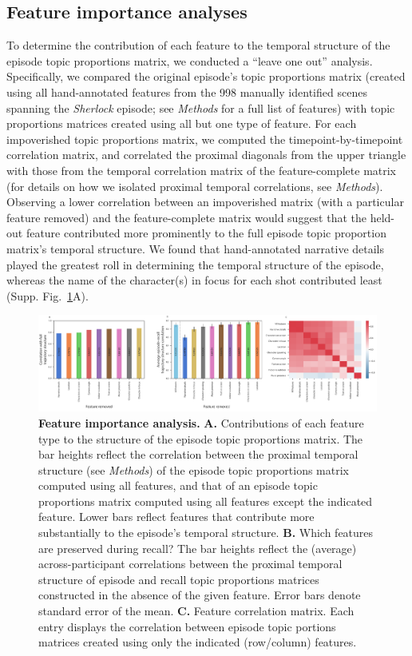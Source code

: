\documentclass{article}
\begin{document}
\subsection*{Feature importance analyses}
To determine the contribution of each feature to the temporal structure of the episode topic proportions matrix, we conducted a ``leave one out'' analysis.  Specifically, we compared the original episode's topic proportions matrix (created using all hand-annotated features from the 998 manually identified scenes spanning the \textit{Sherlock} episode; see \textit{Methods} for a full list of features) with topic proportions matrices created using all but one type of feature.  For each impoverished topic proportions matrix, we computed the timepoint-by-timepoint correlation matrix, and correlated the proximal diagonals from the upper triangle with those from the temporal correlation matrix of the feature-complete matrix (for details on how we isolated proximal temporal correlations, see \textit{Methods}).  Observing a lower correlation between an impoverished matrix (with a particular feature removed) and the feature-complete matrix would suggest that the held-out feature contributed more prominently to the full episode topic proportion matrix's temporal structure.  We found that hand-annotated narrative details played the greatest roll in determining the temporal structure of the episode, whereas the name of the character(s) in focus for each shot contributed least (Supp. Fig.~\ref{fig:feature-importance}A).

\begin{figure}[]
\centering
\includegraphics[width=1\textwidth]{figs/feature_value}
\caption{\small \textbf{Feature importance analysis.} \textbf{A.} Contributions of each feature type to the structure of the episode topic proportions matrix. The bar heights reflect the correlation between the proximal temporal structure (see \textit{Methods}) of the episode topic proportions matrix computed using all features, and that of an episode topic proportions matrix computed using all features except the indicated feature.  Lower bars reflect features that contribute more substantially to the episode's temporal structure. \textbf{B.} Which features are preserved during recall?  The bar heights reflect the (average) across-participant correlations between the proximal temporal structure of episode and recall topic proportions matrices constructed in the absence of the given feature.  Error bars denote standard error of the mean.  \textbf{C.} Feature correlation matrix.  Each entry displays the correlation between episode topic portions matrices created using only the indicated (row/column) features.}
\label{fig:feature-importance}
\end{figure}
\end{document}

